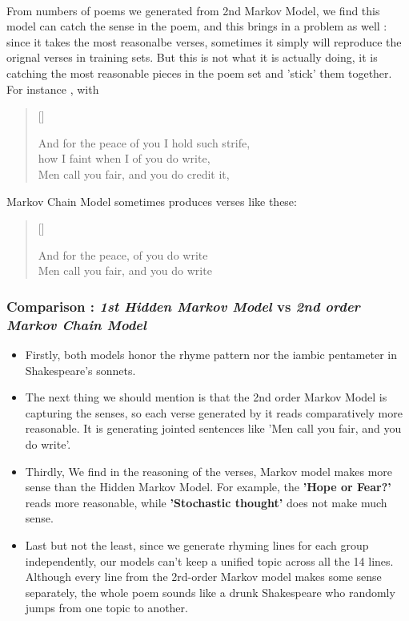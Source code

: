 \paragraph{}
From numbers of poems we generated from 2nd Markov Model, we find this model can catch the sense in the poem, and this brings in a problem as well : since it takes the  most reasonalbe verses, sometimes it simply will reproduce the orignal verses in training sets. But this is not what it is actually doing, it is catching the most reasonable pieces in the poem set and 'stick' them together. For instance , with 
\settowidth{\versewidth}{even  see  shall  accessary  used  must  find  and  herself  enfeebled  mine  it}
\begin{verse}[\versewidth]

{\color{blue}And for the peace} of you I hold such strife,\\
how I faint when I of {\color{red}you do write},\\
{\color{blue}Men call you fair}, and you do credit it,\\

\end{verse}
Markov Chain Model sometimes produces verses like these:
\settowidth{\versewidth}{even  see  shall  accessary  used  must  find  and  herself  enfeebled  mine  it}
\begin{verse}[\versewidth]

{\color{blue}And for the peace}, of {\color{red}you do write}\\
{\color{blue}Men call you fair}, and {\color{red}you do write}\\

\end{verse}
\subsubsection{Comparison : \textit{1st Hidden Markov Model} vs \textit{2nd order Markov Chain Model}}
\vspace{3pt}
\begin{itemize}
	\item Firstly, both models honor the rhyme pattern nor the iambic pentameter in Shakespeare's sonnets.
	\item The next thing we should mention is that the 2nd order Markov Model is capturing the senses, so each verse generated by it reads comparatively more reasonable. It is generating jointed sentences like '{\color{blue}Men call you fair}, and {\color{red}you do write}'.
	\item Thirdly, We find in the reasoning of the verses, Markov model makes more sense than the Hidden Markov Model. For example, the \textbf{'Hope or Fear?'} reads more reasonable, while \textbf{'Stochastic thought'} does not make much sense. 
	\item Last but not the least, since we generate rhyming lines for each group independently, our models can't keep a unified topic across all the 14 lines. Although every line from the 2rd-order Markov model makes some sense separately, the whole poem sounds like a drunk Shakespeare who randomly jumps from one topic to another.
\end{itemize}